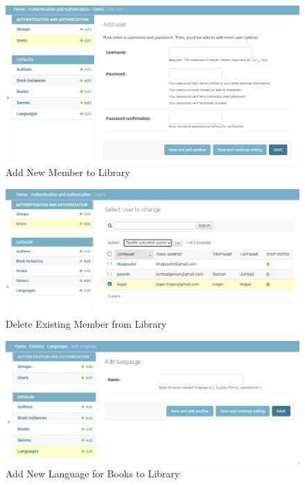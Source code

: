 \documentclass[12pt, a4paper]{report}
\begin{document}
\newpage
\begin{figure}[htb]
	\centering
	\includegraphics[scale=0.5]{./add-member} 
	\caption{Add New Member to Library}
	\label{fig:member-add} 
\end{figure}

\newpage
\begin{figure}[htb]
	\centering
	\includegraphics[scale=0.5]{./delete-member} 
	\caption{Delete Existing Member from Library}
	\label{fig:member-delete} 
\end{figure}

\newpage
\begin{figure}[htb]
	\centering
	\includegraphics[scale=0.5]{./languages} 
	\caption{Add New Language for Books to Library}
	\label{fig:language-add} 
\end{figure}
\end{document}
